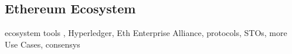 \subsection{Ethereum Ecosystem}
ecosystem tools , Hyperledger, Eth Enterprise Alliance,  protocols, STOs, more Use Cases, consensys